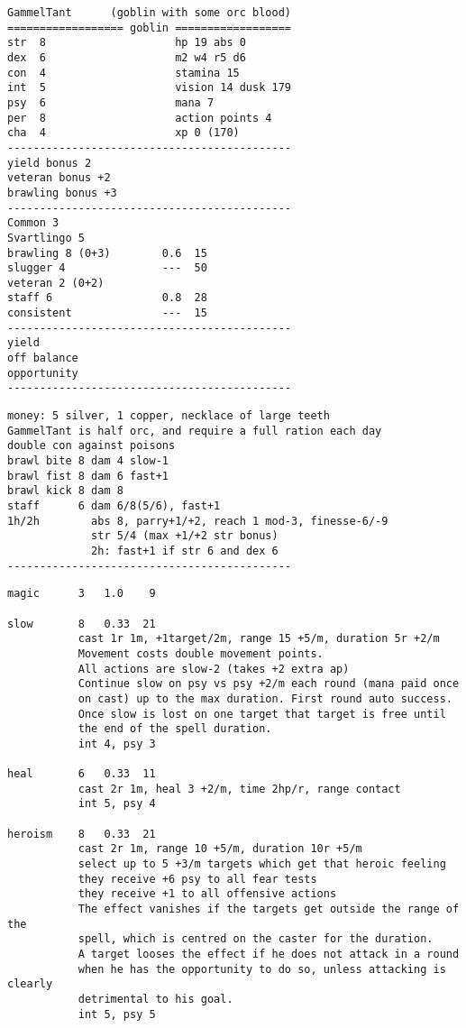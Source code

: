 \goodbreak \small \begin{samepage} \begin{verbatim}
GammelTant      (goblin with some orc blood)
================== goblin ==================
str  8                    hp 19 abs 0
dex  6                    m2 w4 r5 d6
con  4                    stamina 15
int  5                    vision 14 dusk 179
psy  6                    mana 7
per  8                    action points 4
cha  4                    xp 0 (170)
--------------------------------------------
yield bonus 2
veteran bonus +2
brawling bonus +3
--------------------------------------------
Common 3
Svartlingo 5
brawling 8 (0+3)        0.6  15
slugger 4               ---  50
veteran 2 (0+2)
staff 6                 0.8  28
consistent              ---  15
--------------------------------------------
yield
off balance
opportunity
--------------------------------------------
\end{verbatim} \goodbreak \begin{verbatim}
money: 5 silver, 1 copper, necklace of large teeth
GammelTant is half orc, and require a full ration each day
double con against poisons
brawl bite 8 dam 4 slow-1
brawl fist 8 dam 6 fast+1
brawl kick 8 dam 8
staff      6 dam 6/8(5/6), fast+1
1h/2h        abs 8, parry+1/+2, reach 1 mod-3, finesse-6/-9
             str 5/4 (max +1/+2 str bonus)
             2h: fast+1 if str 6 and dex 6
--------------------------------------------
\end{verbatim} \goodbreak \begin{verbatim}
magic      3   1.0    9

slow       8   0.33  21
           cast 1r 1m, +1target/2m, range 15 +5/m, duration 5r +2/m
           Movement costs double movement points.
           All actions are slow-2 (takes +2 extra ap)
           Continue slow on psy vs psy +2/m each round (mana paid once
           on cast) up to the max duration. First round auto success.
           Once slow is lost on one target that target is free until
           the end of the spell duration.
           int 4, psy 3

heal       6   0.33  11
           cast 2r 1m, heal 3 +2/m, time 2hp/r, range contact
           int 5, psy 4

heroism    8   0.33  21
           cast 2r 1m, range 10 +5/m, duration 10r +5/m
           select up to 5 +3/m targets which get that heroic feeling
           they receive +6 psy to all fear tests
           they receive +1 to all offensive actions
           The effect vanishes if the targets get outside the range of the
           spell, which is centred on the caster for the duration.
           A target looses the effect if he does not attack in a round
           when he has the opportunity to do so, unless attacking is clearly
           detrimental to his goal.
           int 5, psy 5
\end{verbatim} \end{samepage} \normalsize

